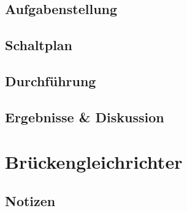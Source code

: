 \documentclass[12pt,a4paper,titlepage]{article}
\begin{document}
\subsection*{Aufgabenstellung}


\subsection*{Schaltplan}

\subsection*{Durchf\"uhrung}


\subsection*{Ergebnisse \& Diskussion}

\section{Brückengleichrichter}

\subsection*{Notizen}
%
%
%
\end{document}
